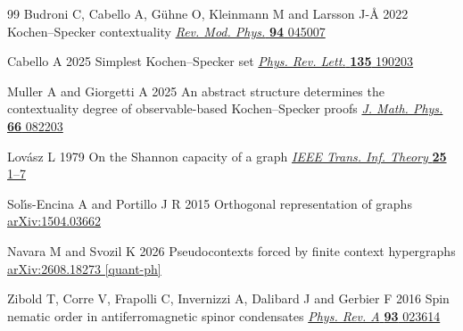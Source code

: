 \documentclass[12pt,a4paper]{article}
\theoremstyle{definition}
\theoremstyle{remark}
\begin{document}
\begin{thebibliography}{99}
Budroni C, Cabello A, G\"uhne O, Kleinmann M and Larsson J-\AA{} 2022 Kochen--Specker contextuality
\href{https://doi.org/10.1103/RevModPhys.94.045007}{\textit{Rev. Mod. Phys.} \textbf{94} 045007}

Cabello A 2025 Simplest Kochen--Specker set
\href{https://doi.org/10.1103/fx9d-488z}{\textit{Phys. Rev. Lett.} \textbf{135} 190203}

Muller A and Giorgetti A 2025 An abstract structure determines the contextuality degree of observable-based Kochen--Specker proofs
\href{https://doi.org/10.1063/5.0245341}{\textit{J. Math. Phys.} \textbf{66} 082203}

Lov\'{a}sz L 1979 On the Shannon capacity of a graph
\href{https://doi.org/10.1109/TIT.1979.1055985}{\textit{IEEE Trans. Inf. Theory} \textbf{25} 1--7}

Sol\'{\i}s-Encina A and Portillo J R 2015 Orthogonal representation of graphs
\href{https://arxiv.org/abs/1504.03662}{arXiv:1504.03662}

Navara M and Svozil K 2026 Pseudocontexts forced by finite context hypergraphs
\href{https://arxiv.org/abs/2608.18273}{arXiv:2608.18273 [quant-ph]}

Zibold T, Corre V, Frapolli C, Invernizzi A, Dalibard J and Gerbier F 2016 Spin nematic order in antiferromagnetic spinor condensates
\href{https://doi.org/10.1103/PhysRevA.93.023614}{\textit{Phys. Rev. A} \textbf{93} 023614}

\end{thebibliography}
\end{document}
